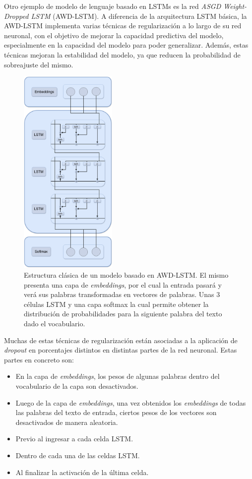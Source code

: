 Otro ejemplo de modelo de lenguaje basado en LSTMs es la red \textit{ASGD Weight-Dropped LSTM} (AWD-LSTM). A diferencia de la arquitectura LSTM básica, la AWD-LSTM implementa varias técnicas de regularización a lo largo de su red neuronal, con el objetivo de mejorar la capacidad predictiva del modelo, especialmente en la capacidad del modelo para poder generalizar. Además, estas técnicas mejoran la estabilidad del modelo, ya que reducen la probabilidad de sobreajuste del mismo.

\begin{figure}[H]
    \centering
    \includegraphics[width=0.42\textwidth]{imagenes/AWD-LSTM.drawio.png}
    \caption{Estructura clásica de un modelo basado en AWD-LSTM. El mismo presenta una capa de \textit{embeddings}, por el cual la entrada pasará y verá sus palabras transformadas en vectores de palabras. Unas 3 células LSTM y una capa softmax la cual permite obtener la distribución de probabilidades para la siguiente palabra del texto dado el vocabulario.}
    \label{fig:awd-lstm}
\end{figure}

Muchas de estas técnicas de regularización están asociadas a la aplicación de \textit{dropout} en porcentajes distintos en distintas partes de la red neuronal. Estas partes en concreto son:

\begin{itemize}
    \item En la capa de \textit{embeddings}, los pesos de algunas palabras dentro del vocabulario de la capa son desactivados.
    \item Luego de la capa de \textit{embeddings}, una vez obtenidos los \textit{embeddings} de todas las palabras del texto de entrada, ciertos pesos de los vectores son desactivados de manera aleatoria.
    \item Previo al ingresar a cada celda LSTM.
    \item Dentro de cada una de las celdas LSTM.
    \item Al finalizar la activación de la última celda.
\end{itemize}

